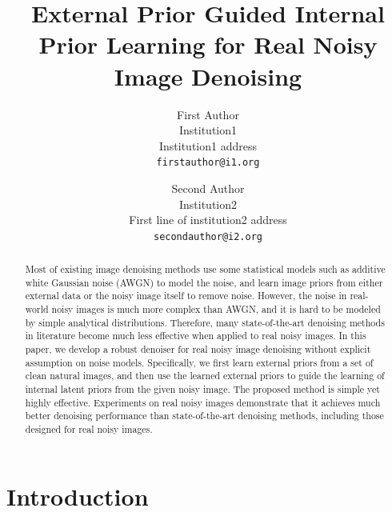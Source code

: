 \documentclass[10pt,twocolumn,letterpaper]{article}
\begin{document}
\title{External Prior Guided Internal Prior Learning for Real Noisy Image Denoising}

\author{First Author\\
Institution1\\
Institution1 address\\
{\tt\small firstauthor@i1.org}
\and
Second Author\\
Institution2\\
First line of institution2 address\\
{\tt\small secondauthor@i2.org}
}

\maketitle 


\begin{abstract}
Most of existing image denoising methods use some statistical models such as additive white Gaussian noise (AWGN) to model the noise, and learn image priors from either external data or the noisy image itself to remove noise. However, the noise in real-world noisy images is much more complex than AWGN, and it is hard to be modeled by simple analytical distributions. Therefore, many state-of-the-art denoising methods in literature become much less effective when applied to real noisy images. In this paper, we develop a robust denoiser for real noisy image denoising without explicit assumption on noise models. Specifically, we first learn external priors from a set of clean natural images, and then use the learned external priors to guide the learning of internal latent priors from the given noisy image. The proposed method is simple yet highly effective. Experiments on real noisy images demonstrate that it achieves much better denoising performance than state-of-the-art denoising methods, including those designed for real noisy images.
\end{abstract}

\section{Introduction} 
\end{document}
